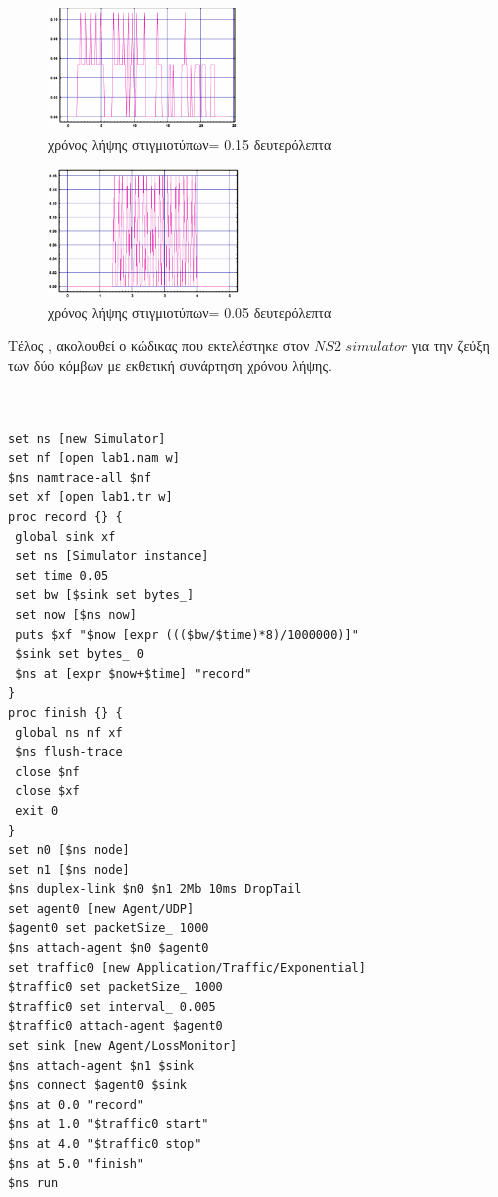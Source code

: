 \documentclass{article}%
\begin{document}
\begin{itemize}
\begin{figure}[htbp]
	\centering
		\includegraphics[width=0.45\textwidth]{6.png}
	\caption{χρόνος λήψης στιγμιοτύπων= 0.15 δευτερόλεπτα}
\end{figure}
\begin{figure}[htbp]
	\centering
	\includegraphics[width=0.45\textwidth]{7.png}
	\caption{χρόνος λήψης στιγμιοτύπων= 0.05 δευτερόλεπτα}
\end{figure}


\end{itemize}

Τέλος , ακολουθεί ο κώδικας που εκτελέστηκε στον $NS2$ $simulator$  για την ζεύξη των δύο κόμβων με εκθετική συνάρτηση χρόνου λήψης.\\\\


\begin{lstlisting}

set ns [new Simulator]
set nf [open lab1.nam w]
$ns namtrace-all $nf
set xf [open lab1.tr w]
proc record {} {
 global sink xf
 set ns [Simulator instance]
 set time 0.05
 set bw [$sink set bytes_]
 set now [$ns now]
 puts $xf "$now [expr ((($bw/$time)*8)/1000000)]"
 $sink set bytes_ 0
 $ns at [expr $now+$time] "record"
}
proc finish {} {
 global ns nf xf
 $ns flush-trace
 close $nf
 close $xf
 exit 0
}
set n0 [$ns node]
set n1 [$ns node]
$ns duplex-link $n0 $n1 2Mb 10ms DropTail
set agent0 [new Agent/UDP]
$agent0 set packetSize_ 1000
$ns attach-agent $n0 $agent0
set traffic0 [new Application/Traffic/Exponential]
$traffic0 set packetSize_ 1000
$traffic0 set interval_ 0.005
$traffic0 attach-agent $agent0
set sink [new Agent/LossMonitor]
$ns attach-agent $n1 $sink
$ns connect $agent0 $sink 
$ns at 0.0 "record"
$ns at 1.0 "$traffic0 start"
$ns at 4.0 "$traffic0 stop"
$ns at 5.0 "finish"
$ns run

\end{lstlisting}
\end{document}

